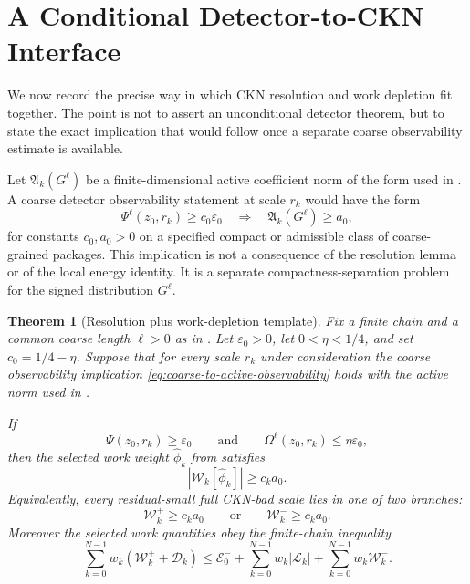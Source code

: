 \documentclass[11pt]{article}
\numberwithin{equation}{section}
\newtheorem{theorem}{Theorem}[section]
\newcommand{\eps}{\varepsilon}
\newcommand{\W}{\mathcal W}
\newcommand{\D}{\mathcal D}
\newcommand{\Lk}{\mathcal L}
\newcommand{\Ek}{\mathcal E}
\newcommand{\Aact}{\mathfrak A}
\begin{document}
\section{A Conditional Detector-to-CKN Interface}\label{sec:conditional-interface}

We now record the precise way in which CKN resolution and work depletion fit together.  The point is not to assert an unconditional detector theorem, but to state the exact implication that would follow once a separate coarse observability estimate is available.

Let \(\Aact_k(G^\ell)\) be a finite-dimensional active coefficient norm of the form used in .  A coarse detector observability statement at scale \(r_k\) would have the form
\begin{equation}\label{eq:coarse-to-active-observability}
\Psi^\ell(z_0,r_k)\ge c_0\eps_0
\quad\Longrightarrow\quad
\Aact_k(G^\ell)\ge a_0,
\end{equation}
for constants \(c_0,a_0>0\) on a specified compact or admissible class of coarse-grained packages.  This implication is not a consequence of the resolution lemma or of the local energy identity.  It is a separate compactness-separation problem for the signed distribution \(G^\ell\).

\begin{theorem}[Resolution plus work-depletion template]\label{thm:resolution-work-template}
Fix a finite chain and a common coarse length \(\ell>0\) as in .  Let \(\eps_0>0\), let \(0<\eta<1/4\), and set \(c_0=1/4-\eta\).  Suppose that for every scale \(r_k\) under consideration the coarse observability implication \eqref{eq:coarse-to-active-observability} holds with the active norm used in .

If
\[
\Psi(z_0,r_k)\ge \eps_0
\qquad\text{and}\qquad
\Omega^\ell(z_0,r_k)\le \eta\eps_0,
\]
then the selected work weight \(\widehat\phi_k\) from  satisfies
\begin{equation}\label{eq:bad-scale-work-alternative}
|\W_k[\widehat\phi_k]|\ge c_k a_0.
\end{equation}
Equivalently, every residual-small full CKN-bad scale lies in one of two branches:
\[
\W_k^+\ge c_k a_0
\qquad\text{or}\qquad
\W_k^-\ge c_k a_0.
\]
Moreover the selected work quantities obey the finite-chain inequality
\begin{equation}\label{eq:template-chain-bound}
\sum_{k=0}^{N-1} w_k(\W_k^+ + \D_k)
\le
\Ek_0^-+
\sum_{k=0}^{N-1}w_k|\Lk_k|+
\sum_{k=0}^{N-1}w_k\W_k^-.
\end{equation}
\end{theorem}
\end{document}
